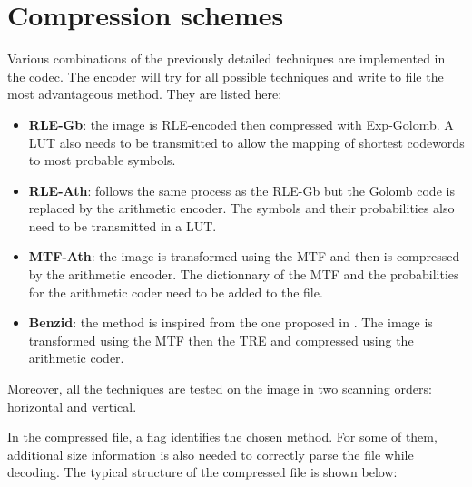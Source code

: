 \section{Compression schemes}

Various combinations of the previously detailed techniques are implemented in the codec. The encoder will try for all possible techniques and write to file the most advantageous method. They are listed here:

\begin{itemize}
	\item \textbf{RLE-Gb}: the image is RLE-encoded then compressed with Exp-Golomb. A LUT also needs to be transmitted to allow the mapping of shortest codewords to most probable symbols.
	
	\item \textbf{RLE-Ath}: follows the same process as the RLE-Gb but the Golomb code is replaced by the arithmetic encoder. The symbols and their probabilities also need to be transmitted in a LUT.
	
	\item \textbf{MTF-Ath}: the image is transformed using the MTF and then is compressed by the arithmetic encoder. The dictionnary of the MTF and the probabilities for the arithmetic coder need to be added to the file.
	
	\item \textbf{Benzid}: the method is inspired from the one proposed in \cite{benzid}. The image is transformed using the MTF then the TRE and compressed using the arithmetic coder.
\end{itemize}

Moreover, all the techniques are tested on the image in two scanning orders: horizontal and vertical.

In the compressed file, a flag identifies the chosen method. For some of them, additional size information is also needed to correctly parse the file while decoding. The typical structure of the compressed file is shown below:

